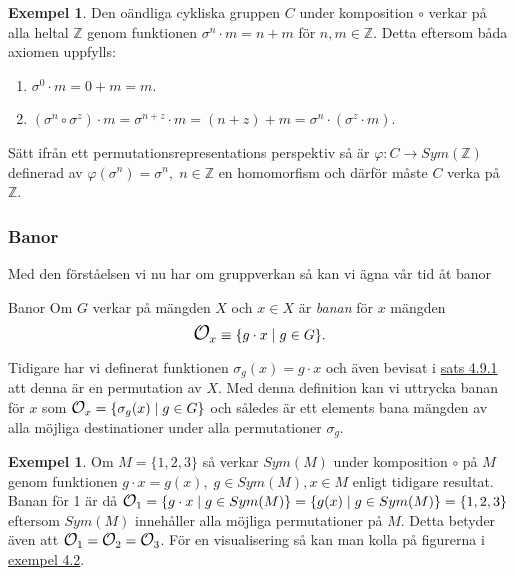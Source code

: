 \documentclass{article}
\newcommand{\orbit}[0]{\mathlarger{\mathlarger{\mathcal{O}}}}
\theoremstyle{definition}
\newtheorem{exmp}[thm]{Exempel}
\begin{document}
\begin{exmp}
  Den oändliga cykliska gruppen $C$ under komposition $\circ$ verkar på alla heltal $\mathbb{Z}$
  genom funktionen $\sigma^n \cdot m = n + m$ för $n, m \in \mathbb{Z}$.
  Detta eftersom båda axiomen uppfylls:
  \begin{enumerate}
    \item $\sigma^0 \cdot m = 0 + m = m$.
    \item $(\sigma^n \circ \sigma^z) \cdot m = \sigma^{n + z} \cdot m = (n + z) + m = 
    \sigma^n \cdot (\sigma^z \cdot m)$.
  \end{enumerate}
  Sätt ifrån ett permutationsrepresentations perspektiv så är 
  $\varphi: C \rightarrow Sym(\mathbb{Z})$ definerad av $\varphi(\sigma^n) = \sigma^n, \; 
  n \in \mathbb{Z}$ en homomorfism och därför måste $C$ verka på $\mathbb{Z}$.
\end{exmp}


\subsubsection{Banor}
Med den förståelsen vi nu har om gruppverkan så kan vi ägna vår tid åt banor
\begin{mydef}{Banor}{}
  Om $G$ verkar på mängden $X$ och $x \in X$ är \textit{banan} för $x$ mängden 
  \[\orbit_x \equiv \{g \cdot x \; | \; g \in G\}.\]
\end{mydef}
Tidigare har vi definerat funktionen $\sigma_g(x) = g \cdot x$ och även bevisat i 
\hyperlink{sats4.9.1}{sats 4.9.1} att 
denna är en permutation av $X$. Med denna definition kan vi uttrycka banan för $x$ som 
$\orbit_x = \{\sigma_g(x) \; | \; g \in G\}$ och 
således är ett elements bana mängden av alla möjliga destinationer under alla permutationer 
$\sigma_g$.

\begin{exmp}
  Om $M = \{1, 2, 3\}$ så verkar $Sym(M)$ under komposition $\circ$ på $M$ 
  genom funktionen $g \cdot x = g(x), \; g \in Sym(M), x \in M$ enligt tidigare resultat. Banan för 
  1 är då $\orbit_1 = \{g \cdot x \; | \; g \in Sym(M)\} = \{g(x) \; | \; g \in Sym(M)\}
  = \{1, 2, 3\}$ eftersom $Sym(M)$ innehåller alla möjliga permutationer på $M$.
  Detta betyder även att $\orbit_1 = \orbit_2 = \orbit_3$. För en visualisering så
  kan man kolla på figurerna i \hyperlink{exempel4.2}{exempel 4.2}.
\end{exmp}
\end{document}
